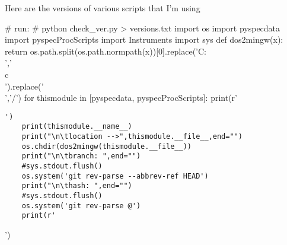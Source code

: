 \documentclass[10pt]{article}
\begin{document}
Here are the versions of various scripts that I'm using
\par
\begin{python}[on]
# run:
# python check_ver.py > versions.txt
import os
import pyspecdata
import pyspecProcScripts
import Instruments
import sys
def dos2mingw(x):
    return os.path.split(os.path.normpath(x))[0].replace('C:\\','\\c\\').replace('\\','/')
for thismodule in [pyspecdata, pyspecProcScripts]:
    print(r'\begin{verbatim}')
    print(thismodule.__name__)
    print("\n\tlocation -->",thismodule.__file__,end="")
    os.chdir(dos2mingw(thismodule.__file__))
    print("\n\tbranch: ",end="")
    #sys.stdout.flush()
    os.system('git rev-parse --abbrev-ref HEAD')
    print("\n\thash: ",end="")
    #sys.stdout.flush()
    os.system('git rev-parse @')
    print(r'\end{verbatim}')
\end{python}
\par


\end{document}
